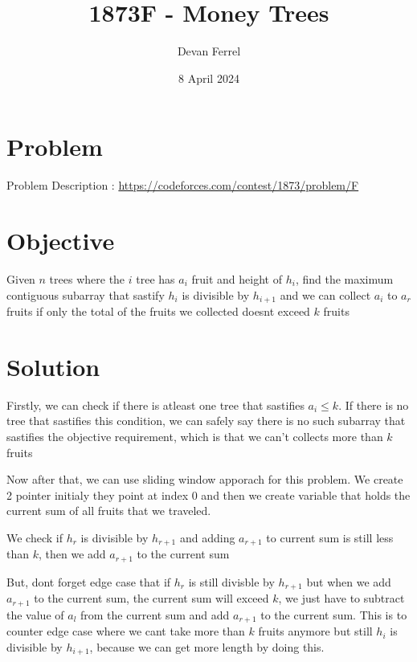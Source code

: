 \documentclass{article}
\title{1873F - Money Trees}
\author{Devan Ferrel}
\date{8 April 2024}
\begin{document}
\maketitle


\section{Problem}

Problem Description : \href{https://codeforces.com/contest/1873/problem/F}{https://codeforces.com/contest/1873/problem/F}

\section{Objective}

Given $n$ trees where the $i$ tree has $a_i$ fruit and height of $h_i$, find the maximum contiguous subarray that sastify $h_i$ is divisible by $h_{i+1}$ and we can collect $a_i$ to $a_r$ fruits if only the total of the fruits we collected doesnt exceed $k$ fruits

\section{Solution}

Firstly, we can check if there is atleast one tree that sastifies $a_i \leq k$. If there is no tree that sastifies this condition, we can safely say there is no such subarray that sastifies the objective requirement, which is that we can't collects more than $k$ fruits

Now after that, we can use sliding window apporach for this problem. We create 2 pointer initialy they point at index $0$ and then we create variable that holds the current sum of all fruits that we traveled. 

We check if $h_r$ is divisible by $h_{r+1}$ and adding $a_{r+1}$  to current sum is still less than $k$, then we add $a_{r+1}$ to the current sum

But, dont forget edge case that if $h_r$ is still divisble by $h_{r+1}$ but when we add $a_{r+1}$ to the current sum, the current sum will exceed $k$, we just have to subtract the value of $a_l$ from the current sum and add $a_{r+1}$ to the current sum. This is to counter edge case where we cant take more than $k$ fruits anymore but still $h_i$ is divisible by $h_{i+1}$, because we can get more length by doing this.
\end{document}
